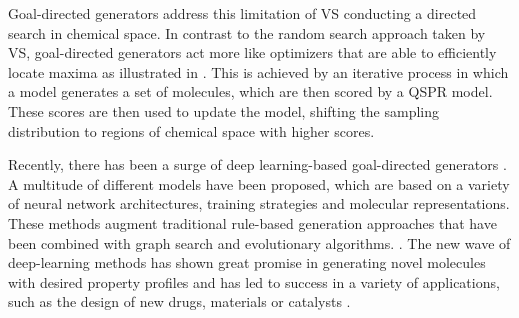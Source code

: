 Goal-directed generators address this limitation of \ac{VS} conducting a directed search in chemical
space. In contrast to the random search approach taken by \ac{VS},
goal-directed generators act more like optimizers that are able to efficiently locate maxima as
illustrated in . This is achieved by an iterative process in
which a model generates a set of molecules, which are then scored by a \ac{QSPR} model. These scores
are then used to update the model, shifting the sampling distribution to regions of chemical space
with higher scores.

Recently, there has been a surge of deep learning-based goal-directed generators
\citep{eltonDeepLearningMolecular2019,sanchez-lengelingInverseMolecularDesign2018,duMachineLearningaidedGenerative2024}.
A multitude of different models have been proposed, which are based on a variety of neural network
architectures, training strategies and molecular representations. These methods augment traditional
rule-based generation approaches that have been combined with graph search and evolutionary
algorithms. \citep{schneiderComputerbasedNovoDesign2005,schneiderNovoMolecularDesign2013}. The new
wave of deep-learning methods has shown great promise in generating novel molecules with desired
property profiles and has led to success in a variety of applications, such as the design of new drugs,
materials or catalysts \citep{zahrtPredictionHigherselectivityCatalysts2019,daveAutonomousDiscoveryBattery2020,kimDatadrivenElectrolyteDesign2023,moonActiveLearningGuides2024}.

